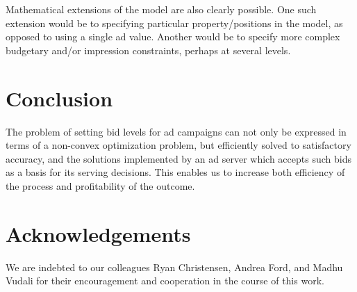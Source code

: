 \documentclass[finalversion,simpleeqnnos]{yrl}
\begin{document}
Mathematical extensions of the model are also clearly possible. One such extension would be to specifying particular property/positions in the model, as opposed to using a single ad value. Another would be to specify more complex budgetary and/or impression constraints, perhaps at several levels.


\section{Conclusion}

The problem of setting bid levels for ad campaigns can not only be expressed in terms of a non-convex optimization problem, but efficiently solved to satisfactory accuracy, and the solutions implemented by an ad server which accepts such bids as a basis for its serving decisions. This enables us to increase both efficiency of the process and profitability of the outcome.

\section{Acknowledgements}
We are indebted to our colleagues Ryan Christensen, Andrea Ford, and Madhu Vudali for their encouragement and cooperation in the course of this work.


 
\end{document}
